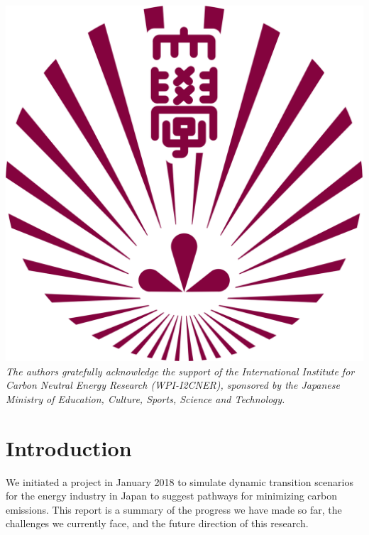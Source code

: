\documentclass[14pt,a4paper]{article} %
\begin{document}
\begin{titlepage}
    \includegraphics[scale=0.04]{ku-logo}\\[1cm] %
     

    \textit{The authors gratefully acknowledge the support of the International Institute for Carbon
Neutral Energy Research (WPI-I2CNER), sponsored by the Japanese Ministry of Education, Culture, Sports, Science and Technology.}  

\end{titlepage}

\section{Introduction}
We initiated a project in January 2018 to simulate dynamic transition scenarios for the energy industry in Japan to suggest pathways for minimizing carbon emissions. This report is a summary of the progress we have made so far, the challenges we currently face, and the future direction of this research. 
\end{document}
